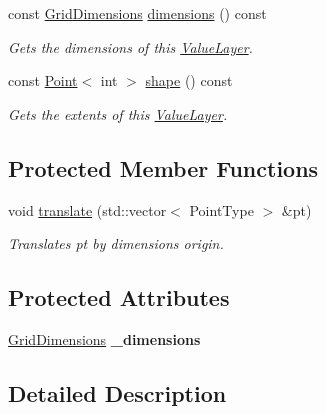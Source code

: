 \begin{DoxyCompactItemize}
const \hyperlink{classrepast_1_1_grid_dimensions}{Grid\-Dimensions} \hyperlink{classrepast_1_1_value_layer_a51fe7fe718305d0c006bc465a14ef0e3}{dimensions} () const 
\begin{DoxyCompactList}\small\item\em Gets the dimensions of this \hyperlink{classrepast_1_1_value_layer}{Value\-Layer}. \end{DoxyCompactList}\item 
const \hyperlink{classrepast_1_1_point}{Point}$<$ int $>$ \hyperlink{classrepast_1_1_value_layer_abe6cc0f23498af967ce82decb0bc5fcc}{shape} () const 
\begin{DoxyCompactList}\small\item\em Gets the extents of this \hyperlink{classrepast_1_1_value_layer}{Value\-Layer}. \end{DoxyCompactList}\end{DoxyCompactItemize}
\subsection*{Protected Member Functions}
\begin{DoxyCompactItemize}
\item 
\hypertarget{classrepast_1_1_value_layer_ac1f75aa259d123bcd2dd5e8bd1630b14}{void \hyperlink{classrepast_1_1_value_layer_ac1f75aa259d123bcd2dd5e8bd1630b14}{translate} (std\-::vector$<$ Point\-Type $>$ \&pt)}\label{classrepast_1_1_value_layer_ac1f75aa259d123bcd2dd5e8bd1630b14}

\begin{DoxyCompactList}\small\item\em Translates pt by dimensions origin. \end{DoxyCompactList}\end{DoxyCompactItemize}
\subsection*{Protected Attributes}
\begin{DoxyCompactItemize}
\item 
\hypertarget{classrepast_1_1_value_layer_a113ad617c865632143a16685faa9de7c}{\hyperlink{classrepast_1_1_grid_dimensions}{Grid\-Dimensions} {\bfseries \-\_\-dimensions}}\label{classrepast_1_1_value_layer_a113ad617c865632143a16685faa9de7c}

\end{DoxyCompactItemize}


\subsection{Detailed Description}
